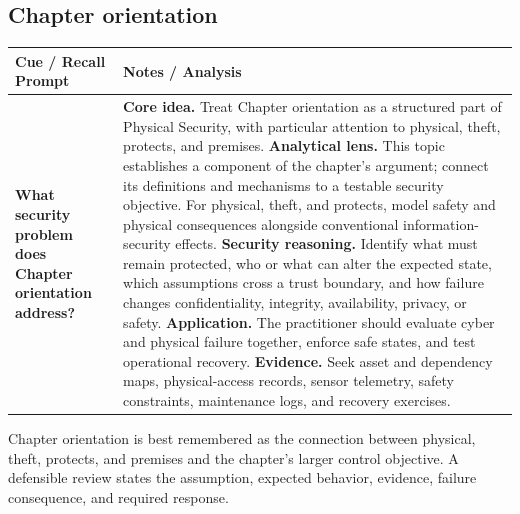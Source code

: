 \documentclass[11pt]{article}
\newcommand{\CornellHeader}{%
\rowcolor{Navy}\color{white}\bfseries Cue / Recall Prompt & \color{white}\bfseries Notes / Analysis\\\hline}
\newcommand{\CornellRow}[2]{%
\cellcolor{CueGray}\RaggedRight\textbf{#1} & \RaggedRight #2\\\hline}
\begin{document}
\subsection*{Chapter orientation}
\begin{longtable}{>{\RaggedRight\arraybackslash}p{}|>{\RaggedRight\arraybackslash}p{}}
\CornellHeader
\CornellRow{What security problem does Chapter orientation address?}{\textbf{Core idea.} Treat Chapter orientation as a structured part of Physical Security, with particular attention to physical, theft, protects, and premises. \textbf{Analytical lens.} This topic establishes a component of the chapter's argument; connect its definitions and mechanisms to a testable security objective. For physical, theft, and protects, model safety and physical consequences alongside conventional information-security effects. \textbf{Security reasoning.} Identify what must remain protected, who or what can alter the expected state, which assumptions cross a trust boundary, and how failure changes confidentiality, integrity, availability, privacy, or safety. \textbf{Application.} The practitioner should evaluate cyber and physical failure together, enforce safe states, and test operational recovery. \textbf{Evidence.} Seek asset and dependency maps, physical-access records, sensor telemetry, safety constraints, maintenance logs, and recovery exercises.}
\end{longtable}
\begin{topicsummary}
Chapter orientation is best remembered as the connection between physical, theft, protects, and premises and the chapter's larger control objective. A defensible review states the assumption, expected behavior, evidence, failure consequence, and required response.
\end{topicsummary}
\end{document}
